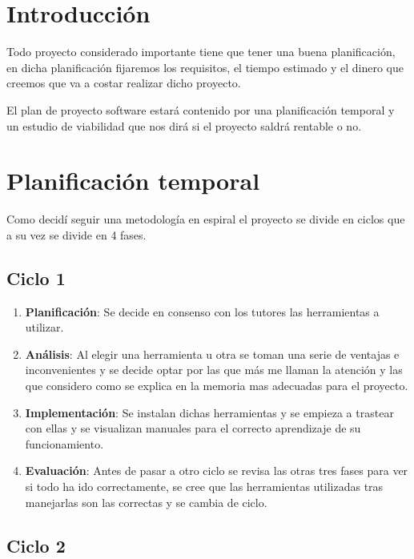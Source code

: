 
\section{Introducción}

Todo proyecto considerado importante tiene que tener una buena planificación, en dicha planificación fijaremos los requisitos, el tiempo estimado y el dinero que creemos que va a costar realizar dicho proyecto.

El plan de proyecto software estará contenido por una planificación temporal y un estudio de viabilidad que nos dirá si el proyecto saldrá rentable o no.

\section{Planificación temporal}

Como decidí seguir una metodología en espiral \cite{ModeloenEspiral} el proyecto se divide en ciclos que a su vez se divide en 4 fases. 


\subsection{Ciclo 1}

	\begin{enumerate}
		\item \textbf{Planificación}: Se decide en consenso con los tutores las herramientas a utilizar.
		\item \textbf{Análisis}: Al elegir una herramienta u otra se toman una serie de ventajas e inconvenientes y se decide optar por las que más me llaman la atención y las que considero como se explica en la memoria mas adecuadas para el proyecto.
		\item \textbf{Implementación}: Se instalan dichas herramientas y se empieza a trastear con ellas y se visualizan manuales para el correcto aprendizaje de su funcionamiento.
		\item \textbf{Evaluación}: Antes de pasar a otro ciclo se revisa las otras tres fases para ver si todo ha ido correctamente, se cree que las herramientas utilizadas tras manejarlas son las correctas y se cambia de ciclo.
	\end{enumerate}


\subsection{Ciclo 2}

